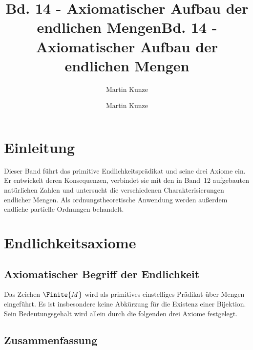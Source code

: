 \documentclass[main.tex]{subfiles}
\title{Bd. 14 - Axiomatischer Aufbau der endlichen Mengen}
\author{Martin Kunze}
\date{}
\begin{document}
\title{Bd. 14 - Axiomatischer Aufbau der endlichen Mengen}
\author{Martin Kunze}
\date{}
\hypersetup{pageanchor=false}
\maketitle
\hypersetup{pageanchor=true}
\setcounter{tocdepth}{3}
\tableofcontents
\setcounter{file}{14}
\renewcommand{\FormulaBandID}{14}

\chapter{Einleitung}

Dieser Band führt das primitive Endlichkeitsprädikat und seine drei Axiome
ein. Er entwickelt deren Konsequenzen, verbindet sie mit den in Band~12
aufgebauten natürlichen Zahlen und untersucht die verschiedenen
Charakterisierungen endlicher Mengen. Als ordnungstheoretische Anwendung
werden außerdem endliche partielle Ordnungen behandelt.

\chapter{Endlichkeitsaxiome}

\section{Axiomatischer Begriff der Endlichkeit}

Das Zeichen \(\Finite{M}\) wird als primitives einstelliges Prädikat über
Mengen eingeführt. Es ist insbesondere keine Abkürzung für die Existenz einer
Bijektion. Sein Bedeutungsgehalt wird allein durch die folgenden drei Axiome
festgelegt.




\section{Zusammenfassung}
\end{document}
